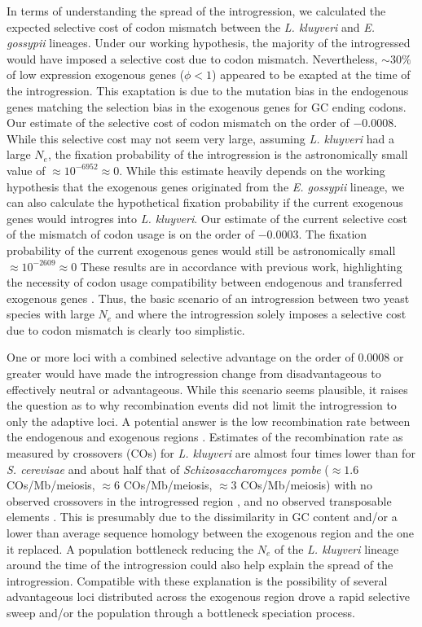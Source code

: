 \documentclass[doublespacing,linenumbers]{bmcart-modified}
\newcommand{\kluyveri}{\textit{L. kluyveri}\xspace}
\newcommand{\gossypii}{\textit{E. gossypii}\xspace}
\newcommand{\GC}{GC content\xspace}
\newcommand{\Ne}{\ensuremath{N_e}\xspace}
\begin{document}
In terms of understanding the spread of the introgression, we calculated the expected selective cost of codon mismatch between the \kluyveri and \gossypii lineages.
Under our working hypothesis, the majority of the introgressed would have imposed a selective cost due to codon mismatch.
Nevertheless, $\sim 30 \%$ of low expression exogenous genes ($\phi < 1$) appeared to be exapted at the time of the introgression.
This exaptation is due to the mutation bias in the endogenous genes matching the selection bias in the exogenous genes for GC ending codons.
Our estimate of the selective cost of codon mismatch on the order of $-0.0008$.
While this selective cost may not seem very large, assuming \kluyveri had a large \Ne, the fixation probability of the introgression is the astronomically small value of $\approx 10^{-6952} \approx 0$.
While this estimate heavily depends on the working hypothesis that the exogenous genes originated from the \gossypii lineage, we can also calculate the hypothetical fixation probability if the current exogenous genes would introgres into \kluyveri. 
Our estimate of the current selective cost of the mismatch of codon usage is on the order of $-0.0003$.
The fixation probability of the current exogenous genes would still be astronomically small $\approx 10^{-2609} \approx 0$
These results are in accordance with previous work, highlighting the necessity of codon usage compatibility between endogenous and transferred exogenous genes \cite{Medrano2004, tuller2011}.
Thus, the basic scenario of an introgression between two yeast species with large \Ne and where the introgression solely imposes a selective cost due to codon mismatch is clearly too simplistic.

One or more loci with a combined selective advantage on the order of $0.0008$ or greater would have made the introgression change from disadvantageous to effectively neutral or advantageous.
While this scenario seems plausible, it raises the question as to why recombination events did not limit the introgression to only the adaptive loci.
A potential answer is the low recombination rate between the endogenous and exogenous regions \cite{payen2009, brion2017}.
Estimates of the recombination rate as measured by crossovers (COs) for \kluyveri are almost four times lower than for \textit{S. cerevisae} and about half that of \textit{Schizosaccharomyces pombe} ($\approx1.6$ COs/Mb/meiosis, $\approx6$ COs/Mb/meiosis, $\approx3$ COs/Mb/meiosis) with no observed crossovers in the introgressed region \cite{brion2017}, and no observed transposable elements \cite{payen2009}.
This is presumably due to the dissimilarity in \GC and/or a lower than average sequence homology between the exogenous region and the one it replaced.
A population bottleneck reducing the \Ne of the \kluyveri lineage around the time of the introgression could also help explain the spread of the introgression.
Compatible with these explanation is the possibility of several advantageous loci distributed across the exogenous region drove a rapid selective sweep and/or the population through a bottleneck speciation process.
\end{document}
